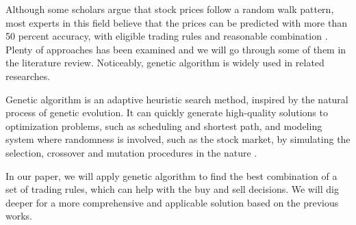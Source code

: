 \documentclass{article}
\begin{document}
Although some scholars argue that stock prices follow a random walk pattern,
most experts in this field believe that the prices can be predicted with more than 50 percent accuracy,
with eligible trading rules and reasonable combination \cite{stock-market-prediction-with-multiple-classifiers}.
Plenty of approaches has been examined and we will go through some of them in the literature review.
Noticeably, genetic algorithm is widely used in related researches.


Genetic algorithm is an adaptive heuristic search method,
inspired by the natural process of genetic evolution.
It can quickly generate high-quality solutions to optimization problems, such as scheduling and shortest path,
and modeling system where randomness is involved, such as the stock market,
by simulating the selection, crossover and mutation procedures in the nature
\cite{genetic-algorithm-review-and-application}.

In our paper, we will apply genetic algorithm to
find the best combination of a set of trading rules, which can help with the buy and sell decisions.
We will dig deeper for a more comprehensive and applicable solution based on the previous works.




\end{document}
